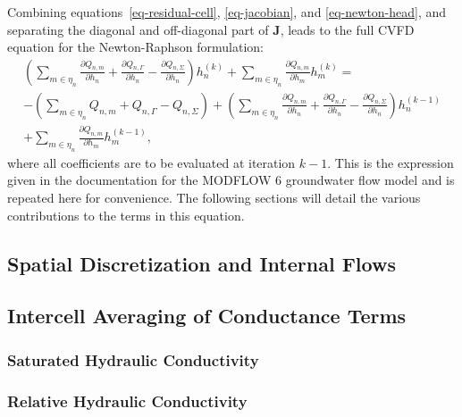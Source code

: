 \documentclass[fleqn]{article}
\begin{document}
Combining equations~\ref{eq-residual-cell}, \ref{eq-jacobian},
and \ref{eq-newton-head}, and separating the diagonal and
off-diagonal part of $\mathbf{J}$, leads to the full CVFD
equation for the Newton-Raphson formulation:
\begin{equation}
  \begin{split}
    \left(
      \sum_{m \in \eta_n} 
        \frac{\partial Q_{n,m}}{\partial h_n} + 
        \frac{\partial Q_{n, \Gamma}}{\partial h_n} - 
        \frac{\partial Q_{n,\Sigma}}{\partial h_n}
    \right) 
    h_n^{(k)} +
    \sum_{m \in \eta_n} \frac{\partial Q_{n,m}}{\partial h_m} 
    h_m^{(k)} =\\
    - 
    \left(
      \sum_{m \in \eta_n} Q_{n,m} + 
      Q_{n, \Gamma} - 
      Q_{n,\Sigma}
    \right) +
    \left(
      \sum_{m \in \eta_n} 
        \frac{\partial Q_{n,m}}{\partial h_n} + 
        \frac{\partial Q_{n, \Gamma}}{\partial h_n} - 
        \frac{\partial Q_{n,\Sigma}}{\partial h_n}
    \right) 
    h_n^{(k-1)}\\
    + \sum_{m \in \eta_n} \frac{\partial Q_{n,m}}{\partial h_m} 
    h_m^{(k-1)},
  \end{split}
\label{eq-cvfd-nr}
\end{equation}
where all coefficients are to be evaluated at iteration $k-1$. 
This is the expression given in the documentation for the
MODFLOW 6 groundwater flow model and is repeated here for
convenience. The following sections will detail the various
contributions to the terms in this equation.

\subsection{Spatial Discretization and Internal Flows}
\subsection{Intercell Averaging of Conductance Terms}\label{sec-cond-avg}
\subsubsection*{Saturated Hydraulic Conductivity}
\subsubsection*{Relative Hydraulic Conductivity}
\end{document}
